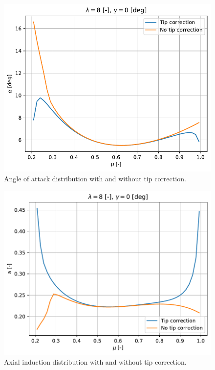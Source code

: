 \begin{figure}[htbp]
	\centering
	\includegraphics[height=0.45\textheight]{./img/tip-correction/alpha.pdf}
	\caption{Angle of attack distribution with and without tip correction.}
	\label{img:tc-alpha}
\end{figure}

\begin{figure}[htbp]
	\centering
	\includegraphics[height=0.45\textheight]{./img/tip-correction/a.pdf}
	\caption{Axial induction distribution with and without tip correction.}
	\label{img:tc-a}
\end{figure}

